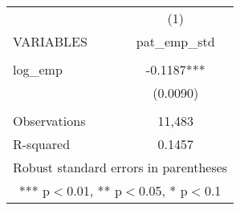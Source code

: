 \documentclass[]{article}
\begin{document}
\begin{tabular}{lc} \hline
 & (1) \\
VARIABLES & pat\_emp\_std \\ \hline
 &  \\
log\_emp & -0.1187*** \\
 & (0.0090) \\
 &  \\
Observations & 11,483 \\
 R-squared & 0.1457 \\ \hline
\multicolumn{2}{c}{ Robust standard errors in parentheses} \\
\multicolumn{2}{c}{ *** p$<$0.01, ** p$<$0.05, * p$<$0.1} \\
\end{tabular}
\end{document}
